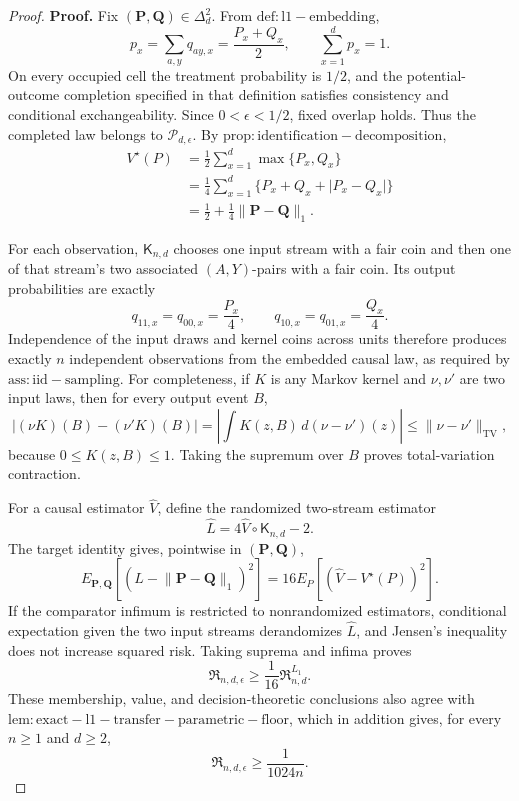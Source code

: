 \documentclass{article}
\begin{document}
\begin{proof}
\textbf{Proof.}
Fix \((\mathbf P,\mathbf Q)\in\Delta_d^2\).  From \(\mathrm{def:l1-embedding}\),
\[
 p_x=\sum_{a,y}q_{ay,x}=\frac{P_x+Q_x}{2},
 \qquad
 \sum_{x=1}^dp_x=1.
\]
On every occupied cell the treatment probability is \(1/2\), and the potential-outcome completion specified in that definition satisfies consistency and conditional exchangeability.  Since \(0<\epsilon<1/2\), fixed overlap holds.  Thus the completed law belongs to \(\mathcal P_{d,\epsilon}\).  By \(\mathrm{prop:identification-decomposition}\),
\[
 \begin{aligned}
 V^\star(P)
 &=\frac12\sum_{x=1}^d\max\{P_x,Q_x\}\\
 &=\frac14\sum_{x=1}^d
   \{P_x+Q_x+\lvert P_x-Q_x\rvert\}\\
 &=\frac12+\frac14\lVert\mathbf P-\mathbf Q\rVert_1.
 \end{aligned}
\]

For each observation, \(\mathsf K_{n,d}\) chooses one input stream with a fair coin and then one of that stream's two associated \((A,Y)\)-pairs with a fair coin.  Its output probabilities are exactly
\[
 q_{11,x}=q_{00,x}=\frac{P_x}{4},
 \qquad
 q_{10,x}=q_{01,x}=\frac{Q_x}{4}.
\]
Independence of the input draws and kernel coins across units therefore produces exactly \(n\) independent observations from the embedded causal law, as required by \(\mathrm{ass:iid-sampling}\).  For completeness, if \(K\) is any Markov kernel and \(\nu,\nu'\) are two input laws, then for every output event \(B\),
\[
 \lvert(\nu K)(B)-(\nu'K)(B)\rvert
 =\left\lvert\int K(z,B)\,d(\nu-\nu')(z)\right\rvert
 \le\lVert\nu-\nu'\rVert_{\mathrm{TV}},
\]
because \(0\le K(z,B)\le1\).  Taking the supremum over \(B\) proves total-variation contraction.

For a causal estimator \(\widehat V\), define the randomized two-stream estimator
\[
 \widehat L=4\widehat V\circ\mathsf K_{n,d}-2.
\]
The target identity gives, pointwise in \((\mathbf P,\mathbf Q)\),
\[
 E_{\mathbf P,\mathbf Q}
 \left[(\widehat L-\lVert\mathbf P-\mathbf Q\rVert_1)^2\right]
 =16E_P\left[(\widehat V-V^\star(P))^2\right].
\]
If the comparator infimum is restricted to nonrandomized estimators, conditional expectation given the two input streams derandomizes \(\widehat L\), and Jensen's inequality does not increase squared risk.  Taking suprema and infima proves
\[
 \mathfrak R_{n,d,\epsilon}\ge\frac1{16}\mathfrak R^{L_1}_{n,d}.
\]
These membership, value, and decision-theoretic conclusions also agree with \(\mathrm{lem:exact-l1-transfer-parametric-floor}\), which in addition gives, for every \(n\ge1\) and \(d\ge2\),
\[
 \mathfrak R_{n,d,\epsilon}\ge\frac1{1024n}.
\]


\end{proof}
\end{document}
